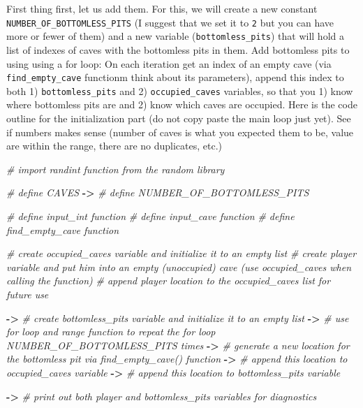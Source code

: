 \documentclass[
]{book}
\newenvironment{Shaded}{\begin{snugshade}}{\end{snugshade}}
\newcommand{\CommentTok}[1]{\textcolor[rgb]{0.56,0.35,0.01}{\textit{#1}}}
\newcommand{\OperatorTok}[1]{\textcolor[rgb]{0.81,0.36,0.00}{\textbf{#1}}}
\begin{document}
First thing first, let us add them. For this, we will create a new constant \texttt{NUMBER\_OF\_BOTTOMLESS\_PITS} (I suggest that we set it to \texttt{2} but you can have more or fewer of them) and a new variable (\texttt{bottomless\_pits}) that will hold a list of indexes of caves with the bottomless pits in them. Add bottomless pits to using using a for loop: On each iteration get an index of an empty cave (via \texttt{find\_empty\_cave} functionm think about its parameters), append this index to both 1) \texttt{bottomless\_pits} and 2) \texttt{occupied\_caves} variables, so that you 1) know where bottomless pits are and 2) know which caves are occupied. Here is the code outline for the initialization part (do not copy paste the main loop just yet). See if numbers makes sense (number of caves is what you expected them to be, value are within the range, there are no duplicates, etc.)

\begin{Shaded}
\begin{Highlighting}[]
\CommentTok{\# import randint function from the random library}

\CommentTok{\# define CAVES}
\OperatorTok{{-}\textgreater{}} \CommentTok{\# define NUMBER\_OF\_BOTTOMLESS\_PITS}

\CommentTok{\# define input\_int function}
\CommentTok{\# define input\_cave function}
\CommentTok{\# define find\_empty\_cave function}

\CommentTok{\# create \textasciigrave{}occupied\_caves\textasciigrave{} variable and initialize it to an empty list}
\CommentTok{\# create \textasciigrave{}player\textasciigrave{} variable and put him into an empty (unoccupied) cave (use \textasciigrave{}occupied\_caves\textasciigrave{} when calling the function)}
\CommentTok{\# append player location to the \textasciigrave{}occupied\_caves\textasciigrave{} list for future use}

\OperatorTok{{-}\textgreater{}} \CommentTok{\# create \textasciigrave{}bottomless\_pits\textasciigrave{} variable and initialize it to an empty list}
\OperatorTok{{-}\textgreater{}} \CommentTok{\# use for loop and range function to repeat the for loop NUMBER\_OF\_BOTTOMLESS\_PITS times}
\OperatorTok{{-}\textgreater{}} \CommentTok{\#     generate a new location for the bottomless pit via find\_empty\_cave() function}
\OperatorTok{{-}\textgreater{}} \CommentTok{\#     append this location to \textasciigrave{}occupied\_caves\textasciigrave{} variable}
\OperatorTok{{-}\textgreater{}} \CommentTok{\#     append this location to \textasciigrave{}bottomless\_pits\textasciigrave{} variable}


\OperatorTok{{-}\textgreater{}} \CommentTok{\# print out both player and bottomless\_pits variables for diagnostics}
\end{Highlighting}
\end{Shaded}
\end{document}
